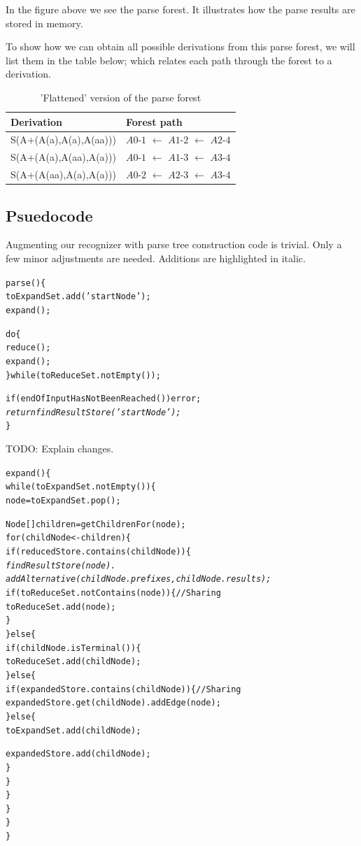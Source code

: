 \documentclass[a4paper,10pt]{article}
\begin{document}
In the figure above we see the parse forest. It illustrates how the parse results are stored in memory.

To show how we can obtain all possible derivations from this parse forest, we will list them in the table below; which relates each path through the forest to a derivation.

\begin{table}[H]
\centering
\begin{tabular}{ p{15em} p{15em} }
Derivation & Forest path\\
\hline
S(A+(A(a),A(a),A(aa))) & $A0$-$1$ $\leftarrow$ $A1$-$2$ $\leftarrow$ $A2$-$4$\\
S(A+(A(a),A(aa),A(a))) & $A0$-$1$ $\leftarrow$ $A1$-$3$ $\leftarrow$ $A3$-$4$\\
S(A+(A(aa),A(a),A(a))) & $A0$-$2$ $\leftarrow$ $A2$-$3$ $\leftarrow$ $A3$-$4$
\end{tabular}
\caption{'Flattened' version of the parse forest}
\end{table}

\subsection{Psuedocode}

Augmenting our recognizer with parse tree construction code is trivial. Only a few minor adjustments are needed. Additions are highlighted in italic.

{\small
\begin{alltt}
parse()\{
  toExpandSet.add('startNode');
  expand();
  
  do\{
    reduce();
    expand();
  \}while(toReduceSet.notEmpty());
  
  if(endOfInputHasNotBeenReached()) error;
  \textit{
  return findResultStore('startNode');}
\}
\end{alltt}
}

TODO: Explain changes.

{\small
\begin{alltt}
expand()\{
  while(toExpandSet.notEmpty())\{
    node = toExpandSet.pop();
    
    Node[] children = getChildrenFor(node);
    for(childNode <- children)\{
      if(reducedStore.contains(childNode))\{\textit{
        findResultStore(node).
            addAlternative(childNode.prefixes, childNode.results);}
        if(toReduceSet.notContains(node))\{ // Sharing
          toReduceSet.add(node);
        \}
      \}else\{
        if(childNode.isTerminal())\{
            toReduceSet.add(childNode);
        \}else\{
          if(expandedStore.contains(childNode))\{ // Sharing
            expandedStore.get(childNode).addEdge(node);
          \}else\{
            toExpandSet.add(childNode);
            
            expandedStore.add(childNode);
          \}
        \}
      \}
    \}
  \}
\}
\end{alltt}
}
\end{document}
